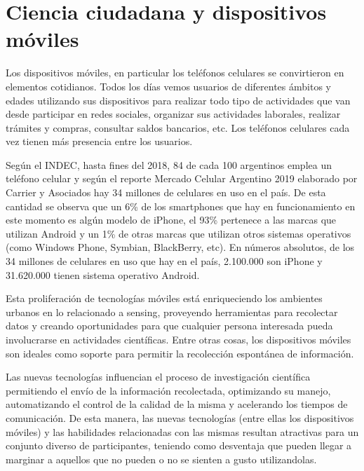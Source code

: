 	
\section{Ciencia ciudadana y dispositivos móviles} \label{ccDispMoviles}

	Los dispositivos móviles, en particular los teléfonos celulares se convirtieron en elementos cotidianos. Todos los días vemos usuarios de diferentes ámbitos y edades utilizando sus dispositivos para realizar todo tipo de actividades que van desde participar en redes sociales, organizar sus actividades laborales, realizar trámites y compras, consultar saldos bancarios, etc. Los teléfonos celulares cada vez tienen más presencia entre los usuarios. 
	
	Según el INDEC, hasta fines del 2018, 84 de cada 100 argentinos emplea un teléfono celular \cite{INDEC} y según el reporte Mercado Celular Argentino 2019 elaborado por Carrier y Asociados hay 34 millones de celulares en uso en el país. De esta cantidad se observa que un 6\% de los smartphones que hay en funcionamiento en este momento es algún modelo de iPhone, el 93\% pertenece a las marcas que utilizan Android y un 1\% de otras marcas que utilizan otros sistemas operativos (como Windows Phone, Symbian, BlackBerry, etc). En números absolutos, de los 34 millones de celulares en uso que hay en el país, 2.100.000 son iPhone y 31.620.000 tienen sistema operativo Android. \cite{carrier}	
		
	Esta proliferación de tecnologías móviles está enriqueciendo los ambientes urbanos en lo relacionado a sensing, proveyendo herramientas para recolectar datos y creando oportunidades para que cualquier persona interesada pueda involucrarse en actividades científicas. Entre otras cosas, los dispositivos móviles son ideales como soporte para permitir la recolección espontánea de información. \cite{kim2013sensr}
	
	Las nuevas tecnologías influencian el proceso de investigación científica permitiendo el envío de la información recolectada, optimizando su manejo, automatizando el control de la calidad de la misma y acelerando los tiempos de comunicación. De esta manera, las nuevas tecnologías (entre ellas los dispositivos móviles) y las habilidades relacionadas con las mismas resultan atractivas para un conjunto diverso de participantes, teniendo como desventaja que pueden llegar a marginar a aquellos que no pueden o no se sienten a gusto utilizandolas. \cite{newman2012future}
